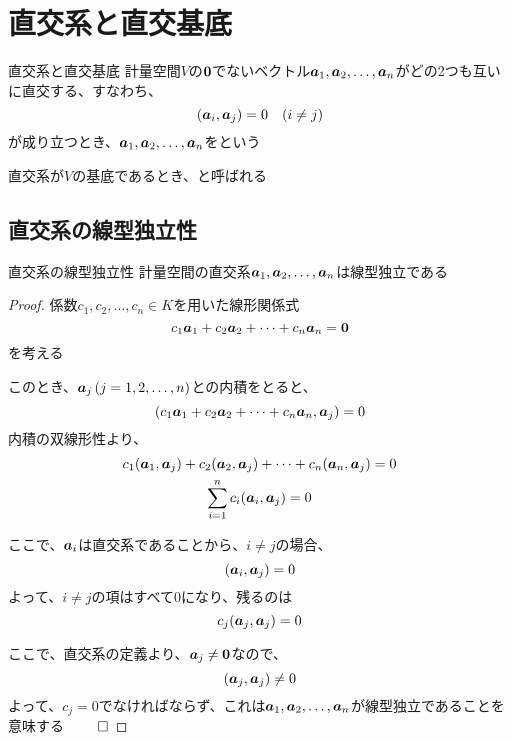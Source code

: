 \documentclass[../../../topic_linear-algebra]{subfiles}
\begin{document}
\sectionline
\section{直交系と直交基底}

\begin{definition}{直交系と直交基底}
  計量空間$V$の$\vb*{0}$でないベクトル$\vb*{a}_1, \vb*{a}_2, \ldots, \vb*{a}_n$がどの2つも互いに直交する、すなわち、
  \begin{equation*}
    (\vb*{a}_i, \vb*{a}_j) = 0 \quad (i \neq j)
  \end{equation*}
  が成り立つとき、$\vb*{a}_1, \vb*{a}_2, \ldots, \vb*{a}_n$をという

  直交系が$V$の基底であるとき、と呼ばれる
\end{definition}

\subsection{直交系の線型独立性}

\begin{theorem}{直交系の線型独立性}\label{thm:orthogonal-set-is-independent}
  計量空間の直交系$\vb*{a}_1, \vb*{a}_2, \ldots, \vb*{a}_n$は線型独立である
\end{theorem}

\begin{proof}
  係数$c_1, c_2, \ldots, c_n \in K$を用いた線形関係式
  \begin{equation*}
    c_1 \vb*{a}_1 + c_2 \vb*{a}_2 + \cdots + c_n \vb*{a}_n = \vb*{0}
  \end{equation*}
  を考える

  このとき、$\vb*{a}_j \, (j=1,2,\ldots,n)$との内積をとると、
  \begin{equation*}
    (c_1 \vb*{a}_1 + c_2 \vb*{a}_2 + \cdots + c_n \vb*{a}_n, \vb*{a}_j) = 0
  \end{equation*}
  内積の双線形性より、
  \begin{gather*}
    c_1 (\vb*{a}_1, \vb*{a}_j) + c_2 (\vb*{a}_2, \vb*{a}_j) + \cdots + c_n (\vb*{a}_n, \vb*{a}_j) = 0 \\
    \sum_{i=1}^n c_i (\vb*{a}_i, \vb*{a}_j) = 0
  \end{gather*}

  ここで、$\vb*{a}_i$は直交系であることから、$i \neq j$の場合、
  \begin{equation*}
    (\vb*{a}_i, \vb*{a}_j) = 0
  \end{equation*}
  よって、$i \neq j$の項はすべて0になり、残るのは
  \begin{equation*}
    c_j (\vb*{a}_j, \vb*{a}_j) = 0
  \end{equation*}

  ここで、直交系の定義より、$\vb*{a}_j \neq \vb*{0}$なので、
  \begin{equation*}
    (\vb*{a}_j, \vb*{a}_j) \neq 0
  \end{equation*}
  よって、$c_j = 0$でなければならず、これは$\vb*{a}_1, \vb*{a}_2, \ldots, \vb*{a}_n$が線型独立であることを意味する $\qed$
\end{proof}
\end{document}
